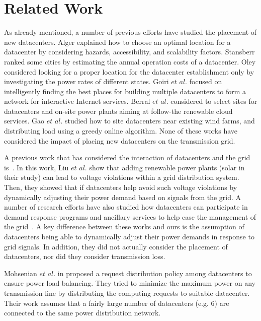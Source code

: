 \section{Related Work}
\label{sec:related}

As already mentioned, a number of previous efforts have studied the placement of new datacenters.  Alger \cite{Dalger05} explained how to choose an optimal location for a datacenter by considering hazards, accessibility, and scalability factors.  Stansberr \cite{Stansberr06} ranked some cities by estimating the annual operation costs of a datacenter.  Oley \cite{Boley09} considered looking for a proper location for the datacenter establishment only by investigating the power rates of different states.  Goiri $\textit{et al.}$ \cite{Goiri11place} focused on intelligently finding the best places for building multiple datacenters to form a network for interactive Internet services.  Berral $\textit{et al.}$ \cite{berral2014building} considered to select sites for datacenters and on-site power plants aiming at follow-the renewable cloud services.  Gao $\textit{et al.}$ \cite{gao2013answer} studied how to site datacenters near existing wind farms, and distributing load using a greedy online algorithm.  None of these works have considered the impact of placing new datacenters on the transmission grid.

A previous work that has considered the interaction of datacenters and the grid is~\cite{liu2014pricing}.  In this work, Liu $\textit{et al.}$ show that adding renewable power plants (solar in their study) can lead to voltage violations within a grid distribution system.  Then, they showed that if datacenters help avoid such voltage violations by dynamically adjusting their power demand based on signals from the grid.  A number of research efforts have also studied how datacenters can participate in demand response programs and ancillary services to help ease the management of the grid~\cite{Aikema12,AdamWierman2014}.  A key difference between these works and ours is the assumption of datacenters being able to dynamically adjust their power demands in response to grid signals.  In addition, they did not actually consider the placement of datacenters, nor did they consider transmission loss.

Mohsenian $\textit{et al.}$ in \cite{Mohsenian-Rad10grid} proposed a request distribution policy among datacenters to ensure power load balancing. They tried to minimize the maximum power on any transmission line by distributing the computing requests to suitable datacenter. Their work assumes that a fairly large number of datacenters (e.g. 6) are connected to the same power distribution network.  

